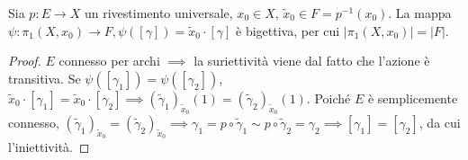 \begin{prop}
  Sia $p:E \rightarrow X$ un rivestimento universale, $x_0 \in X$, $\tilde{x}_0 \in F=p^{-1}(x_0)$. La mappa $\psi:\pi_1(X, x_0) \rightarrow F, \psi([\gamma])=\tilde{x}_0 \cdot [\gamma]$ è bigettiva, per cui $|\pi_1(X, x_0)|=|F|$.
\end{prop}

\begin{proof}
  $E$ connesso per archi $\implies$ la suriettività viene dal fatto che l'azione è transitiva.
  Se $\psi([\gamma_1])=\psi([\gamma_2])$, $\tilde{x}_0 \cdot [\gamma_1]=\tilde{x}_0 \cdot [\gamma_2] \implies (\tilde{\gamma}_1)_{\tilde{x}_0}(1)=(\tilde{\gamma}_2)_{\tilde{x}_0}(1)$.
  Poiché $E$ è semplicemente connesso, $(\tilde{\gamma}_1)_{\tilde{x}_0}=(\tilde{\gamma}_2)_{\tilde{x}_0} \implies \gamma_1=p \circ \tilde{\gamma}_1 \sim p \circ \tilde{\gamma}_2=\gamma_2 \implies [\gamma_1]=[\gamma_2]$, da cui l'iniettività.
\end{proof}
